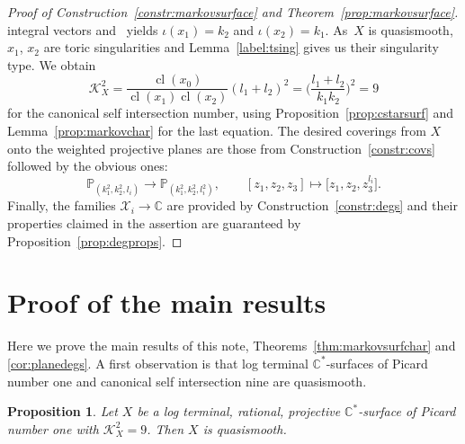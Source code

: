\documentclass[pdftex]{sigma}
\newtheorem{prop}[thm]{Proposition}
\theoremstyle{definition}
\def\CC{{\mathbb C}}
\def\PP{{\mathbb P}}
\DeclareMathOperator{\cl}{cl}
\begin{document}
\begin{proof}[Proof of Construction~\ref{constr:markovsurface}
and Theorem~\ref{prop:markovsurface}]
integral vectors and~\cite[Proposition~8.9]{HaHaSp} yields
$\iota(x_1)=k_2$ and $\iota(x_2)=k_1$.
As~$X$ is quasismooth, $x_1$, $x_2$ are toric
singularities and Lemma~\ref{label:tsing}
gives us their singularity type.
We obtain
\[
\mathcal{K}_X^2
 =
\frac{\cl(x_0)}{\cl(x_1)\cl(x_2)} (l_1+l_2)^2
 =
\biggl(\frac{l_1+l_2}{k_1k_2}\biggr)^2
 =
9
\]
for the canonical self intersection number,
using Proposition~\ref{prop:cstarsurf} and
Lemma~\ref{prop:markovchar} for the last equation.
The desired coverings from $X$ onto the
weighted projective planes are those from
Construction~\ref{constr:covs} followed by the
obvious ones:
\[
\PP_{(k_1^2,k_2^2,l_i)} \to \PP_{(k_1^2,k_2^2,l_i^2)},
\qquad
[z_1,z_2,z_3] \mapsto \bigl[z_1,z_2,z_3^{l_i}\bigr].
\]
Finally, the families $\mathcal{X}_i \to \CC$
are provided by Construction~\ref{constr:degs}
and their properties claimed in the assertion
are guaranteed by
Proposition~\ref{prop:degprops}.
\end{proof}









\section{Proof of the main results}

Here we prove the main results of this note,
Theorems~\ref{thm:markovsurfchar} and \ref{cor:planedegs}.
A first observation is that log terminal $\CC^*$-surfaces
of Picard number one and canonical self intersection nine
are quasismooth.


\begin{prop}
\label{prop:notqs}
Let $X$ be a log terminal, rational, projective
$\CC^*$-surface of Picard number one with
$\mathcal{K}_X^2 = 9$. Then $X$ is quasismooth.
\end{prop}
\end{document}

